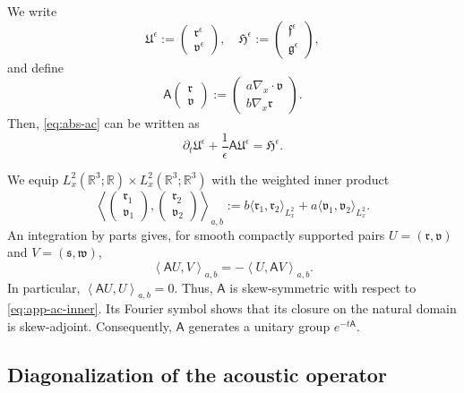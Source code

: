 \documentclass[10pt,reqno]{amsart}
\numberwithin{equation}{section}
\newcommand{\lt}{\left}
\newcommand{\rt}{\right}
\newcommand{\lal}{\langle}
\newcommand{\ral}{\rangle}
\newcommand{\R}{\mathbb R}
\newcommand{\bq}{\begin{equation}}
\newcommand{\eq}{\end{equation}}
\newcommand{\pa}{\partial}
\begin{document}
We write
\[
\mathfrak U^\epsilon :=
\begin{pmatrix}
\mathfrak r^\epsilon\\
\mathfrak v^\epsilon
\end{pmatrix},
\quad
\mathfrak H^\epsilon :=
\begin{pmatrix}
\mathfrak f^\epsilon\\
\mathfrak g^\epsilon
\end{pmatrix},
\]
and define
\[
\mathsf A
\begin{pmatrix}
\mathfrak r\\
\mathfrak v
\end{pmatrix}
:=
\begin{pmatrix}
a\nabla_x\cdot\mathfrak v\\
b\nabla_x\mathfrak r
\end{pmatrix}.
\]
Then, \eqref{eq:abs-ac} can be written as
\[
\pa_t\mathfrak U^\epsilon + \frac{1}{\epsilon} \mathsf A \mathfrak U^\epsilon = \mathfrak H^\epsilon.
\]

We equip $L^2_x(\R^3;\R) \times L^2_x(\R^3;\R^3)$ with the weighted inner product
\bq\label{eq:app-ac-inner}
\lt\lal \begin{pmatrix} \mathfrak r_1\\ \mathfrak v_1 \end{pmatrix}, \begin{pmatrix} \mathfrak r_2\\ \mathfrak v_2 \end{pmatrix}
\rt\ral_{a,b} := b \lal \mathfrak r_1, \mathfrak r_2 \ral_{L^2_x} + a \lal \mathfrak v_1, \mathfrak v_2 \ral_{L^2_x}.
\eq
An integration by parts gives, for smooth compactly supported pairs
$U=(\mathfrak r,\mathfrak v)$ and $V=(\mathfrak s,\mathfrak w)$,
\[
\lt\lal \mathsf A U,V\rt\ral_{a,b} = -\lt\lal U,\mathsf A V\rt\ral_{a,b}.
\]
In particular, $\lt\lal \mathsf A U,U\rt\ral_{a,b}=0$. Thus, $\mathsf A$ is skew-symmetric with respect to \eqref{eq:app-ac-inner}. Its Fourier symbol shows that its closure on the natural domain is skew-adjoint. Consequently, $\mathsf A$ generates a unitary group $e^{-t\mathsf A}$.
 

%
%
%
%
%
%
%
%
%
%
 
\subsection{Diagonalization of the acoustic operator} 
\end{document}
